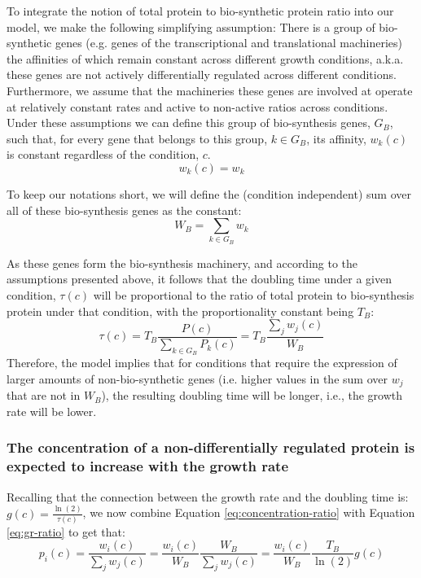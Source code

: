 \documentclass[notitlepage]{article}
\begin{document}
To integrate the notion of total protein to bio-synthetic protein ratio into our model, we make the following simplifying assumption:
There is a group of bio-synthetic genes (e.g. genes of the transcriptional and translational machineries) the affinities of which remain constant across different growth conditions, a.k.a. these genes are not actively differentially regulated across different conditions.
Furthermore, we assume that the machineries these genes are involved at operate at relatively constant rates and active to non-active ratios across conditions.
Under these assumptions we can define this group of bio-synthesis genes, $G_B$, such that, for every gene that belongs to this group, $k \in G_B$, its affinity, $w_k(c)$ is constant regardless of the condition, $c$.
\begin{equation}
  \label{eq:biosynth-def}
  w_k(c)=w_k
\end{equation}

To keep our notations short, we will define the (condition independent) sum over all of these bio-synthesis genes as the constant:
\[
W_B = \sum_{k\in G_B}w_k
\]

As these genes form the bio-synthesis machinery, and according to the assumptions presented above, it follows that the doubling time under a given condition, $\tau(c)$ will be proportional to the ratio of total protein to bio-synthesis protein under that condition, with the proportionality constant being $T_B$:
\begin{equation}
  \label{eq:gr-ratio}
  \tau(c) = T_B\frac{P(c)}{\sum_{k\in G_B}P_k(c)}=T_B\frac{\sum_jw_j(c)}{W_B}
\end{equation}
Therefore, the model implies that for conditions that require the expression of larger amounts of non-bio-synthetic genes (i.e. higher values in the sum over $w_j$ that are not in $W_B$), the resulting doubling time will be longer, i.e., the growth rate will be lower.

\subsubsection{The concentration of a non-differentially regulated protein is expected to increase with the growth rate} 
Recalling that the connection between the growth rate and the doubling time is: $g(c)=\frac{\ln(2)}{\tau(c)}$, we now combine Equation \ref{eq:concentration-ratio} with Equation \ref{eq:gr-ratio} to get that:
\begin{equation}
  \label{eq:default-response}
  p_i(c)=\frac{w_i(c)}{\sum_jw_j(c)}=\frac{w_i(c)}{W_B}\frac{W_B}{\sum_jw_j(c)}=\frac{w_i(c)}{W_B}\frac{T_B}{\ln(2)}g(c)
\end{equation}
\end{document}
